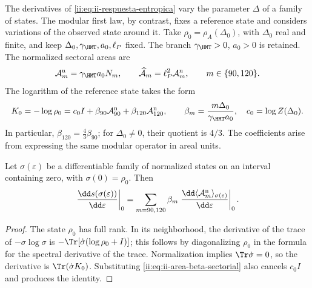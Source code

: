 The derivatives of \eqref{ii:eq:ii-respuesta-entropica} vary the parameter
\(\Delta\) of a family of states. The modular first law, by contrast, fixes
a reference state and considers variations of the observed state
around it. Take
\(\rho_0=\rho_A(\Delta_0)\), with \(\Delta_0\) real and finite,
and keep \(\Delta_0,\gamma_{\HMT},a_0,\ell_P\) fixed.
The branch \(\gamma_{\HMT}>0\), \(a_0>0\) is retained.
The normalized sectoral areas are
\begin{equation}
 \mathcal A_m^{\rm n}=\gamma_{\HMT}a_0N_m,
 \qquad
 \widehat{\mathcal A}_m=\ell_P^2\mathcal A_m^{\rm n},
 \qquad m\in\{90,120\}.
 \label{ii:eq:ii-area-sector-normalizado}
\end{equation}
The logarithm of the reference state takes the form
\begin{equation}
 K_0=-\log\rho_0
 =c_0I+\beta_{90}\mathcal A_{90}^{\rm n}
         +\beta_{120}\mathcal A_{120}^{\rm n},
 \qquad
 \beta_m=\frac{m\Delta_0}{\gamma_{\HMT}a_0},
 \quad c_0=\log Z(\Delta_0).
 \label{ii:eq:ii-area-beta-sectorial}
\end{equation}
In particular, \(\beta_{120}=\tfrac43\beta_{90}\); for
\(\Delta_0\ne0\), their quotient is \(4/3\). The coefficients
arise from expressing the same modular operator in areal units.

\begin{theorem}
\label{ii:thm:ii-area-primera-ley}
Let \(\sigma(\varepsilon)\) be a differentiable family of normalized
states on an interval containing zero, with
\(\sigma(0)=\rho_0\). Then
\begin{equation}
 \left.\frac{\dd s(\sigma(\varepsilon))}{\dd\varepsilon}\right|_0
 =\sum_{m=90,120}\beta_m
   \left.\frac{\dd\langle\mathcal A_m^{\rm n}\rangle_
                       {\sigma(\varepsilon)}}{\dd\varepsilon}\right|_0.
 \label{ii:eq:ii-area-primera-ley}
\end{equation}
\end{theorem}
\begin{proof}
The state \(\rho_0\) has full rank. In its neighborhood, the derivative
of the trace of \(-\sigma\log\sigma\) is
\(-\Tr[\dot\sigma(\log\rho_0+I)]\); this follows by diagonalizing
\(\rho_0\) in the formula for the spectral derivative of the trace.
Normalization implies \(\Tr\dot\sigma=0\), so the
derivative is \(\Tr(\dot\sigma K_0)\). Substituting
\eqref{ii:eq:ii-area-beta-sectorial} also cancels \(c_0I\) and
produces the identity.
\end{proof}


